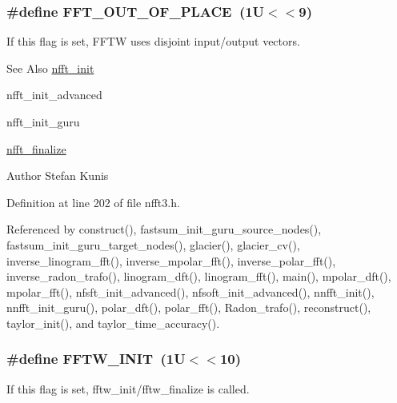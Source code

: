 \hypertarget{group__nfft_ga9193f768d5839892d0e303080c370eaf}{
\subsubsection[{F\-F\-T\-\_\-\-O\-U\-T\-\_\-\-O\-F\-\_\-\-P\-L\-A\-C\-E}]{\setlength{\rightskip}{0pt plus 5cm}\#define F\-F\-T\-\_\-\-O\-U\-T\-\_\-\-O\-F\-\_\-\-P\-L\-A\-C\-E~(1\-U$<$$<$9)}}\label{group__nfft_ga9193f768d5839892d0e303080c370eaf}
If this flag is set, F\-F\-T\-W uses disjoint input/output vectors.

\begin{DoxySeeAlso}{See Also}
\hyperlink{group__nfft_ga1dfeaf18f3735f035afa62ca768d99c4}{nfft\-\_\-init} 

nfft\-\_\-init\-\_\-advanced 

nfft\-\_\-init\-\_\-guru 

\hyperlink{group__nfft_ga614f9f7af5b0d5491afa9495393c4dc3}{nfft\-\_\-finalize} 
\end{DoxySeeAlso}
\begin{DoxyAuthor}{Author}
Stefan Kunis 
\end{DoxyAuthor}


Definition at line 202 of file nfft3.\-h.



Referenced by construct(), fastsum\-\_\-init\-\_\-guru\-\_\-source\-\_\-nodes(), fastsum\-\_\-init\-\_\-guru\-\_\-target\-\_\-nodes(), glacier(), glacier\-\_\-cv(), inverse\-\_\-linogram\-\_\-fft(), inverse\-\_\-mpolar\-\_\-fft(), inverse\-\_\-polar\-\_\-fft(), inverse\-\_\-radon\-\_\-trafo(), linogram\-\_\-dft(), linogram\-\_\-fft(), main(), mpolar\-\_\-dft(), mpolar\-\_\-fft(), nfsft\-\_\-init\-\_\-advanced(), nfsoft\-\_\-init\-\_\-advanced(), nnfft\-\_\-init(), nnfft\-\_\-init\-\_\-guru(), polar\-\_\-dft(), polar\-\_\-fft(), Radon\-\_\-trafo(), reconstruct(), taylor\-\_\-init(), and taylor\-\_\-time\-\_\-accuracy().

\hypertarget{group__nfft_gad3fe6867a3351441c6f44dd5a3746f5b}{
\subsubsection[{F\-F\-T\-W\-\_\-\-I\-N\-I\-T}]{\setlength{\rightskip}{0pt plus 5cm}\#define F\-F\-T\-W\-\_\-\-I\-N\-I\-T~(1\-U$<$$<$10)}}\label{group__nfft_gad3fe6867a3351441c6f44dd5a3746f5b}
If this flag is set, fftw\-\_\-init/fftw\-\_\-finalize is called.

